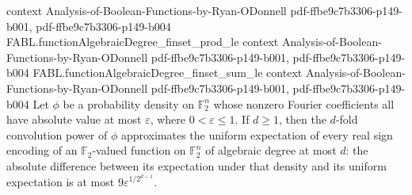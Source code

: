 \begin{theorem}
  {context}
  {Analysis-of-Boolean-Functions-by-Ryan-ODonnell}
  {pdf-ffbe9c7b3306-p149-b001,
    pdf-ffbe9c7b3306-p149-b004}
\proofstep
  {FABL.functionAlgebraicDegree_finset_prod_le}
  {context}
  {Analysis-of-Boolean-Functions-by-Ryan-ODonnell}
  {pdf-ffbe9c7b3306-p149-b001,
    pdf-ffbe9c7b3306-p149-b004}
\proofstep
  {FABL.functionAlgebraicDegree_finset_sum_le}
  {context}
  {Analysis-of-Boolean-Functions-by-Ryan-ODonnell}
  {pdf-ffbe9c7b3306-p149-b001,
    pdf-ffbe9c7b3306-p149-b004}
Let $\phi$ be a probability density on $\mathbb F_2^n$ whose nonzero Fourier
coefficients all have absolute value at most $\varepsilon$, where $0<\varepsilon\leq1$.
If $d\geq1$, then the $d$-fold convolution power of $\phi$ approximates the uniform
expectation of every real sign encoding of an $\mathbb F_2$-valued function on $\mathbb
F_2^n$ of algebraic degree at most $d$: the absolute difference between its expectation
under that density and its uniform expectation is at most $9\varepsilon^{1/2^{d-1}}$.
\end{theorem}

